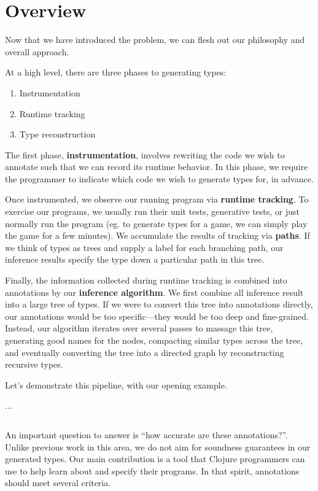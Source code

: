 \chapter{Overview}

Now that we have introduced the problem,
we can flesh out our philosophy and overall
approach.

At a high level, there are three phases to
generating types:

\begin{enumerate}
  \item Instrumentation
  \item Runtime tracking
  \item Type reconstruction
\end{enumerate}

The first phase, \textbf{instrumentation}, involves
rewriting the code we wish to annotate such
that we can record its runtime behavior.
In this phase, we require the programmer to
indicate which code we wish to generate types
for, in advance.

Once instrumented, we observe our running program
via \textbf{runtime tracking}. To exercise our programs,
we usually run their unit tests, generative tests,
or just normally run the program (eg. to generate types for
a game, we can simply play the game for a few minutes).
We accumulate the results of tracking via \textbf{paths}.
If we think of types as trees and supply a label
for each branching path, our inference results
specify the type down a particular path in this tree.

Finally, the information collected during runtime tracking
is combined into annotations by our \textbf{inference algorithm}.
We first combine all inference result into a large tree of
types. If we were to convert this tree into annotations directly,
our annotations would be too specific---they would be too
deep and fine-grained.
Instead, our algorithm iterates over several passes to massage
this tree, generating good names for the nodes, compacting similar
types across the tree, and
eventually converting the tree into a directed graph by reconstructing
recursive types.

Let's demonstrate this pipeline, with our opening example.

...

\begin{verbatim}

\end{verbatim}

An important question to answer is ``how accurate are these annotations?''.
Unlike previous work in this area, we do not aim for soundness guarantees
in our generated types. 
Our main contribution is a tool that Clojure programmers
can use to help learn about and specify their programs.
In that spirit, annotations should meet several criteria.

